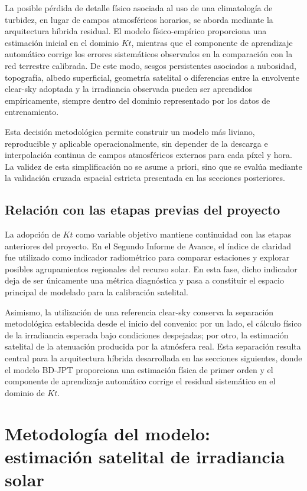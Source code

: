 \documentclass[../main.tex]{subfiles}
\begin{document}
La posible pérdida de detalle físico asociada al uso de una climatología de turbidez, en lugar de campos atmosféricos horarios, se aborda mediante la arquitectura híbrida residual. El modelo físico-empírico proporciona una estimación inicial en el dominio $Kt$, mientras que el componente de aprendizaje automático corrige los errores sistemáticos observados en la comparación con la red terrestre calibrada. De este modo, sesgos persistentes asociados a nubosidad, topografía, albedo superficial, geometría satelital o diferencias entre la envolvente clear-sky adoptada y la irradiancia observada pueden ser aprendidos empíricamente, siempre dentro del dominio representado por los datos de entrenamiento.

Esta decisión metodológica permite construir un modelo más liviano, reproducible y aplicable operacionalmente, sin depender de la descarga e interpolación continua de campos atmosféricos externos para cada píxel y hora. La validez de esta simplificación no se asume a priori, sino que se evalúa mediante la validación cruzada espacial estricta presentada en las secciones posteriores.

\subsection{Relación con las etapas previas del proyecto}

La adopción de $Kt$ como variable objetivo mantiene continuidad con las etapas anteriores del proyecto. En el Segundo Informe de Avance, el índice de claridad fue utilizado como indicador radiométrico para comparar estaciones y explorar posibles agrupamientos regionales del recurso solar. En esta fase, dicho indicador deja de ser únicamente una métrica diagnóstica y pasa a constituir el espacio principal de modelado para la calibración satelital.

Asimismo, la utilización de una referencia clear-sky conserva la separación metodológica establecida desde el inicio del convenio: por un lado, el cálculo físico de la irradiancia esperada bajo condiciones despejadas; por otro, la estimación satelital de la atenuación producida por la atmósfera real. Esta separación resulta central para la arquitectura híbrida desarrollada en las secciones siguientes, donde el modelo BD-JPT proporciona una estimación física de primer orden y el componente de aprendizaje automático corrige el residual sistemático en el dominio de $Kt$.

\section{Metodología del modelo: estimación satelital de irradiancia solar}
\end{document}
